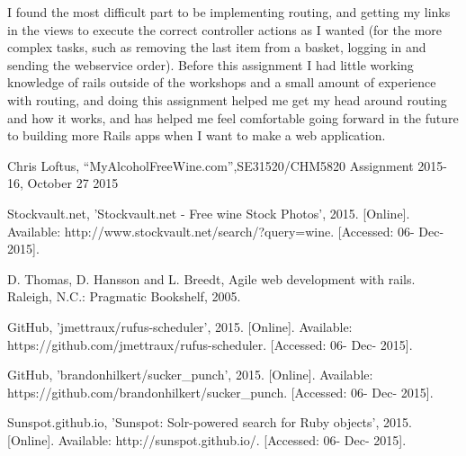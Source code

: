 \documentclass[12pt]{article}
\begin{document}
I found the most difficult part to be implementing routing, and getting my links in the views to execute the correct controller actions as I wanted (for the more complex tasks, such as removing the last item from a basket, logging in and sending the webservice order). Before this assignment I had little working knowledge of rails outside of the workshops and a small amount of experience with routing, and doing this assignment helped me get my head around routing and how it works, and has helped me feel comfortable going forward in the future to building more Rails apps when I want to make a web application. 



\clearpage


\begin{thebibliography}{5}

 Chris Loftus, ``MyAlcoholFreeWine.com'',SE31520/CHM5820 Assignment 2015-16, October 27 2015

 Stockvault.net, 'Stockvault.net - Free wine Stock Photos', 2015. [Online]. Available: http://www.stockvault.net/search/?query=wine. [Accessed: 06- Dec- 2015].

 D. Thomas, D. Hansson and L. Breedt, Agile web development with rails. Raleigh, N.C.: Pragmatic Bookshelf, 2005.

 GitHub, 'jmettraux/rufus-scheduler', 2015. [Online]. Available: https://github.com/jmettraux/rufus-scheduler. [Accessed: 06- Dec- 2015].

 GitHub, 'brandonhilkert/sucker\_punch', 2015. [Online]. Available: https://github.com/brandonhilkert/sucker\_punch. [Accessed: 06- Dec- 2015].

  Sunspot.github.io, 'Sunspot: Solr-powered search for Ruby objects', 2015. [Online]. Available: http://sunspot.github.io/. [Accessed: 06- Dec- 2015].

\end{thebibliography}
\end{document}
